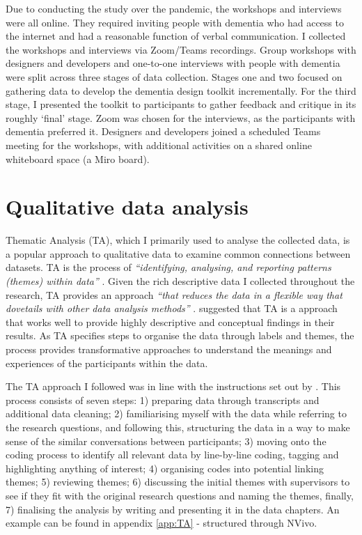 Due to conducting the study over the pandemic, the workshops and interviews were all online. They required inviting people with dementia who had access to the internet and had a reasonable function of verbal communication. I collected the workshops and interviews via Zoom/Teams recordings. Group workshops with designers and developers and one-to-one interviews with people with dementia were split across three stages of data collection. Stages one and two focused on gathering data to develop the dementia design toolkit incrementally. For the third stage, I presented the toolkit to participants to gather feedback and critique in its roughly `final' stage. Zoom was chosen for the interviews, as the participants with dementia preferred it. Designers and developers joined a scheduled Teams meeting for the workshops, with additional activities on a shared online whiteboard space (a Miro board).

\section{Qualitative data analysis}
\label{QualDataAnalysis}
Thematic Analysis (TA), which I primarily used to analyse the collected data, is a popular approach to qualitative data to examine common connections between datasets. TA is the process of \textit{``identifying, analysing, and reporting patterns (themes) within data''} \citep[p.79]{braun_using_2006}. Given the rich descriptive data I collected throughout the research, TA provides an approach \textit{``that reduces the data in a flexible way that dovetails with other data analysis methods''} \citep[p.808]{castleberry2018thematic}. \cite{kiger2020thematic} suggested that TA is a approach that works well to provide highly descriptive and conceptual findings in their results. As TA specifies steps to organise the data through labels and themes, the process provides transformative approaches to understand the meanings and experiences of the participants within the data. 

The TA approach I followed was in line with the instructions set out by \cite{braun_one_2020}. This process consists of seven steps: 1) preparing data through transcripts and additional data cleaning; 2) familiarising myself with the data while referring to the research questions, and following this, structuring the data in a way to make sense of the similar conversations between participants; 3) moving onto the coding process to identify all relevant data by line-by-line coding, tagging and highlighting anything of interest; 4) organising codes into potential linking themes; 5) reviewing themes; 6) discussing the initial themes with supervisors to see if they fit with the original research questions and naming the themes, finally, 7) finalising the analysis by writing and presenting it in the data chapters. An example can be found in appendix \ref{app:TA} - structured through NVivo.


